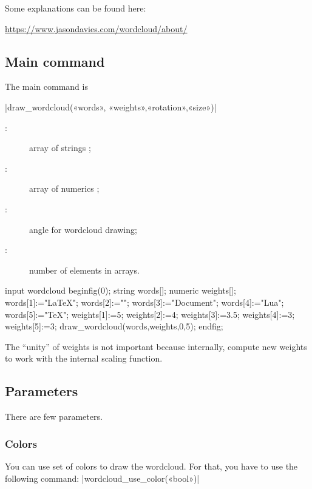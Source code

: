 \documentclass[english]{ltxdoc}
\begin{document}
Some explanations can be found here:
\begin{center}
  \url{https://www.jasondavies.com/wordcloud/about/}
\end{center}

\subsection{Main command}

The main command is 

\commande|draw_wordcloud(«words», «weights»,«rotation»,«size»)|\smallskip{}

\begin{description}
\item[:] array of strings ;
\item[:] array of numerics ;
\item[:] angle for wordcloud drawing;
\item[:] number of elements in arrays.   
\end{description}

\begin{ExempleMP}
input wordcloud
beginfig(0);
string words[];
numeric weights[];
words[1]:="\LaTeX";
words[2]:="";
words[3]:="Document";
words[4]:="Lua";
words[5]:="\TeX";
weights[1]:=5;
weights[2]:=4;
weights[3]:=3.5;
weights[4]:=3;
weights[5]:=3;
draw_wordcloud(words,weights,0,5);
endfig;
\end{ExempleMP}

\begin{remark}
The ``unity'' of weights is not important because internally,
 compute new weights to work
with the internal scaling function.  
\end{remark}

\subsection{Parameters}

There are few parameters.

\subsubsection{Colors}\label{sec:colors}

You can use set of colors to draw the wordcloud. For that, you have to use the
following command:
\commande|wordcloud_use_color(«bool»)|\smallskip{}
\end{document}
